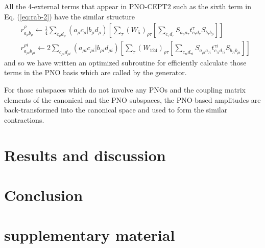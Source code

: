 \documentclass[aip,jcp,amsmath,twocolumn,floatfix,reprint,fleqn]{revtex4-1}
\begin{document}
%
All the 4-external terms that appear in PNO-CEPT2 such as the sixth term in Eq. (\ref{eq:rab-2}) have the similar structure
%
\begin{align}
  &r_{a_{\rho}b_\rho}^\rho\leftarrow\frac{1}{4}\sum_{c_{\rho}d_{\rho}} (a_\rho c_\rho |b_\rho d_\rho ) \left[\sum_\tau (W_5)_{\rho\tau} \left[\sum_{c_{\tau}d_{\tau}} S_{a_\rho a_\tau} t_{c_\tau d_\tau}^\tau S_{b_\tau b_\rho} \right] \right] \\
  &r_{a_{\rho i}b_{\rho i}}^{\rho i}\leftarrow 2\sum_{c_{\rho i}d_{\rho i}} (a_{\rho i} c_{\rho i} |b_{\rho i} d_{\rho i} ) \left[\sum_\tau (W_{124})_{\rho\tau} \left[\sum_{c_{\tau i}d_{\tau i}} S_{a_{\rho i} a_{\tau i}} t_{c_{\tau i} d_{\tau i}}^{\tau i} S_{b_{\tau i} b_{\rho i}} \right] \right]
\end{align}
%
and so we have written an optimized subroutine for efficiently calculate those terms in the PNO basis which are called by the generator.
%


%
For those subspaces which do not involve any PNOs and the coupling matrix elements of the canonical and the PNO subspaces, the PNO-based amplitudes are back-transformed into the canonical space and used to form the similar contractions.
%


%

\section{Results and discussion}\label{Sec:results}

\section{Conclusion}\label{Sec:Conclusion}

\section*{supplementary material}

\begin{acknowledgments}  
  
\end{acknowledgments}


\end{document}
